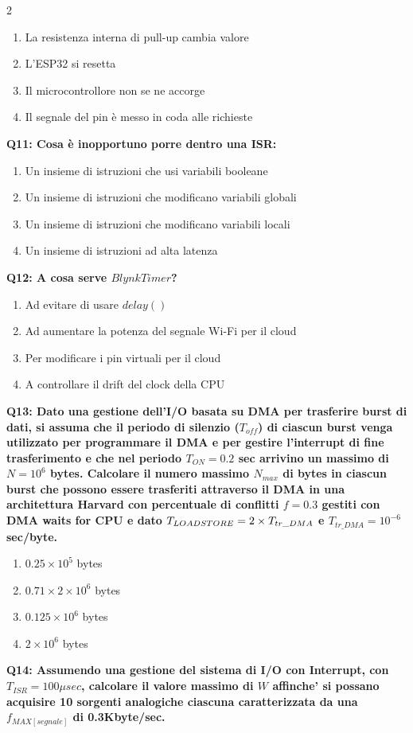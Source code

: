 \documentclass[10pt]{article}
\begin{document}
\begin{multicols}{2}
\begin{enumerate}[label=\arabic*.]
\item La resistenza interna di pull-up cambia valore
\item L’ESP32 si resetta
\item Il microcontrollore non se ne accorge
\item Il segnale del pin è messo in coda alle richieste
\end{enumerate}
\textbf{Q11: Cosa è inopportuno porre dentro una ISR:}

\begin{enumerate}[label=\arabic*.]
\item Un insieme di istruzioni che usi variabili booleane
\item Un insieme di istruzioni che modificano variabili globali
\item Un insieme di istruzioni che modificano variabili locali
\item Un insieme di istruzioni ad alta latenza
\end{enumerate}
\textbf{Q12: A cosa serve $BlynkTimer$?}

\begin{enumerate}[label=\arabic*.]
\item Ad evitare di usare $delay()$
\item Ad aumentare la potenza del segnale Wi-Fi per il cloud
\item Per modificare i pin virtuali per il cloud
\item A controllare il drift del clock della CPU
\end{enumerate}
\textbf{Q13: Dato una gestione dell’I/O basata su DMA per trasferire burst di dati, si assuma che il periodo di silenzio  ($T_{off}$) di ciascun burst venga utilizzato per programmare il DMA e per gestire l’interrupt di fine trasferimento e che nel periodo $T_{ON} = 0.2$ sec arrivino un massimo di $N=10^6$ bytes. Calcolare il numero massimo $N_{max}$ di bytes in ciascun burst che possono essere trasferiti attraverso il DMA in una architettura Harvard con percentuale di conflitti $f = 0.3$ gestiti con DMA waits for CPU e dato $T_{LOAD\/STORE} = 2 \times T_{tr\_DMA}$ e $T_{tr\_DMA} = 10^{-6}$ sec/byte.}

\begin{enumerate}[label=\arabic*.]
\item $0.25 \times 10^5$ bytes
\item $0.71 \times 2 \times 10^6$ bytes
\item $0.125 \times 10^6$ bytes
\item $2 \times 10^6$ bytes
\end{enumerate}
\textbf{Q14: Assumendo una gestione del sistema di I/O con Interrupt, con $T_{ISR}=100\mu sec$, calcolare il valore massimo di $W$ affinche' si possano acquisire 10 sorgenti analogiche ciascuna caratterizzata da una $f_{MAX[segnale]}$ di 0.3Kbyte/sec.}


\end{multicols}
\end{document}
